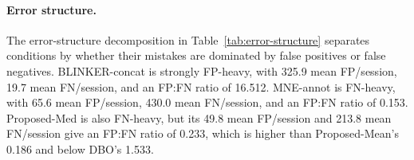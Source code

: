 \paragraph{Error structure.}
The error-structure decomposition in Table~\ref{tab:error-structure} separates conditions by whether their mistakes are dominated by false positives or false negatives. BLINKER-concat is strongly FP-heavy, with 325.9 mean FP/session, 19.7 mean FN/session, and an FP:FN ratio of 16.512. MNE-annot is FN-heavy, with 65.6 mean FP/session, 430.0 mean FN/session, and an FP:FN ratio of 0.153. Proposed-Med is also FN-heavy, but its 49.8 mean FP/session and 213.8 mean FN/session give an FP:FN ratio of 0.233, which is higher than Proposed-Mean's 0.186 and below DBO's 1.533.
